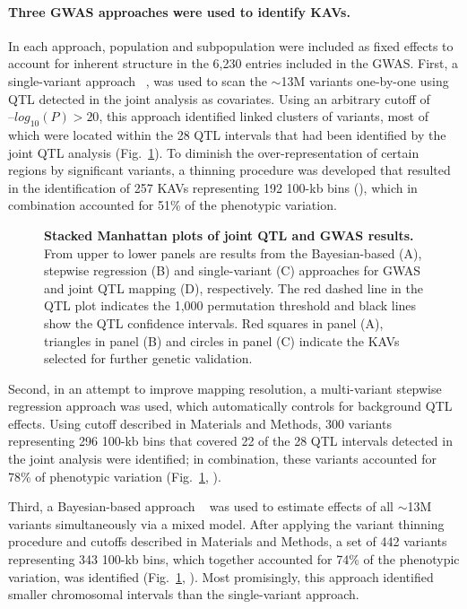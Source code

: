 \documentclass[10pt,letterpaper]{article}
\begin{document}
\paragraph{Three GWAS approaches were used to identify KAVs.}
In each approach, population and subpopulation were included as fixed effects to account for inherent structure in the 6,230 entries included in the GWAS. First, a single-variant approach ~\cite{Manolio2010}, was used to scan the $\sim$13M variants one-by-one using QTL detected in the joint analysis as covariates. Using an arbitrary cutoff of $–log_{10}(P) > 20$, this approach identified linked clusters of variants, most of which were located within the 28 QTL intervals that had been identified by the joint QTL analysis (Fig.~\ref{fig3}). To diminish the over-representation of certain regions by significant variants, a thinning procedure was developed that resulted in the identification of 257 KAVs representing 192 100-kb bins (), which in combination accounted for 51\% of the phenotypic variation.

\begin{figure}[h]
\caption{{\bf Stacked Manhattan plots of joint QTL and GWAS results.}
From upper to lower panels are results from the Bayesian-based (A), stepwise regression (B) and single-variant (C) approaches for GWAS and joint QTL mapping (D), respectively. The red dashed line in the QTL plot indicates the 1,000 permutation threshold and black lines show the QTL confidence intervals. Red squares in panel (A), triangles in panel (B) and circles in panel (C) indicate the KAVs selected for further genetic validation.}
\label{fig3}
\end{figure}

Second, in an attempt to improve mapping resolution, a multi-variant stepwise regression approach was used, which automatically controls for background QTL effects. Using cutoff described in Materials and Methods, 300 variants representing 296 100-kb bins that covered 22 of the 28 QTL intervals detected in the joint analysis were identified; in combination, these variants accounted for 78\% of phenotypic variation (Fig.~\ref{fig3}, ). 

Third, a Bayesian-based approach ~\cite{Habier2011} was used to estimate effects of all $\sim$13M variants simultaneously via a mixed model. After applying the variant thinning procedure and cutoffs described in Materials and Methods, a set of 442 variants representing 343 100-kb bins, which together accounted for 74\% of the phenotypic variation, was identified (Fig.~\ref{fig3}, ). Most promisingly, this approach identified smaller chromosomal intervals than the single-variant approach.
\end{document}
